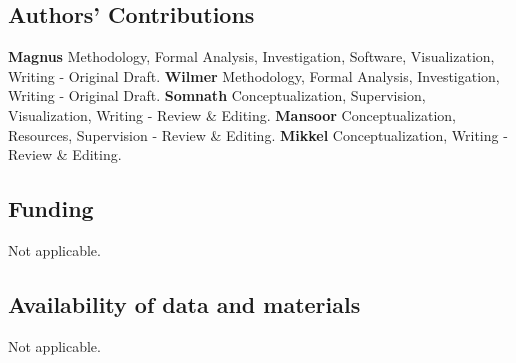 \documentclass[final,5p,times,twopage,twocolumn,a4paper]{elsarticle}
\begin{document}
\subsection*{Authors' Contributions}

\textbf{Magnus} Methodology, Formal Analysis, Investigation, Software, Visualization, Writing - Original Draft.
\textbf{Wilmer} Methodology, Formal Analysis, Investigation, Writing - Original Draft.
\textbf{Somnath} Conceptualization, Supervision, Visualization, Writing - Review \& Editing.
\textbf{Mansoor} Conceptualization, Resources, Supervision - Review \& Editing.
\textbf{Mikkel} Conceptualization, Writing - Review \& Editing.

\subsection*{Funding}
Not applicable.
\subsection*{Availability of data and materials}
Not applicable.


\end{document}
